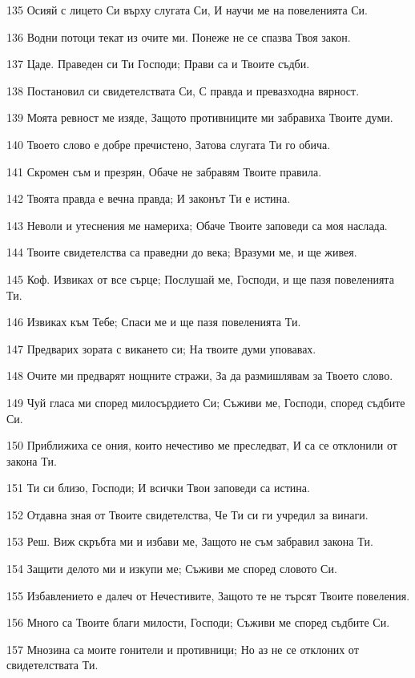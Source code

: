 \par 135 Осияй с лицето Си върху слугата Си, И научи ме на повеленията Си.
\par 136 Водни потоци текат из очите ми. Понеже не се спазва Твоя закон.
\par 137 Цаде. Праведен си Ти Господи; Прави са и Твоите съдби.
\par 138 Постановил си свидетелствата Си, С правда и превазходна вярност.
\par 139 Моята ревност ме изяде, Защото противниците ми забравиха Твоите думи.
\par 140 Твоето слово е добре пречистено, Затова слугата Ти го обича.
\par 141 Скромен съм и презрян, Обаче не забравям Твоите правила.
\par 142 Твоята правда е вечна правда; И законът Ти е истина.
\par 143 Неволи и утеснения ме намериха; Обаче Твоите заповеди са моя наслада.
\par 144 Твоите свидетелства са праведни до века; Вразуми ме, и ще живея.
\par 145 Коф. Извиках от все сърце; Послушай ме, Господи, и ще пазя повеленията Ти.
\par 146 Извиках към Тебе; Спаси ме и ще пазя повеленията Ти.
\par 147 Предварих зората с викането си; На твоите думи уповавах.
\par 148 Очите ми предварят нощните стражи, За да размишлявам за Твоето слово.
\par 149 Чуй гласа ми според милосърдието Си; Съживи ме, Господи, според съдбите Си.
\par 150 Приближиха се ония, които нечестиво ме преследват, И са се отклонили от закона Ти.
\par 151 Ти си близо, Господи; И всички Твои заповеди са истина.
\par 152 Отдавна зная от Твоите свидетелства, Че Ти си ги учредил за винаги.
\par 153 Реш. Виж скръбта ми и избави ме, Защото не съм забравил закона Ти.
\par 154 Защити делото ми и изкупи ме; Съживи ме според словото Си.
\par 155 Избавлението е далеч от Нечестивите, Защото те не търсят Твоите повеления.
\par 156 Много са Твоите благи милости, Господи; Съживи ме според съдбите Си.
\par 157 Мнозина са моите гонители и противници; Но аз не се отклоних от свидетелствата Ти.
